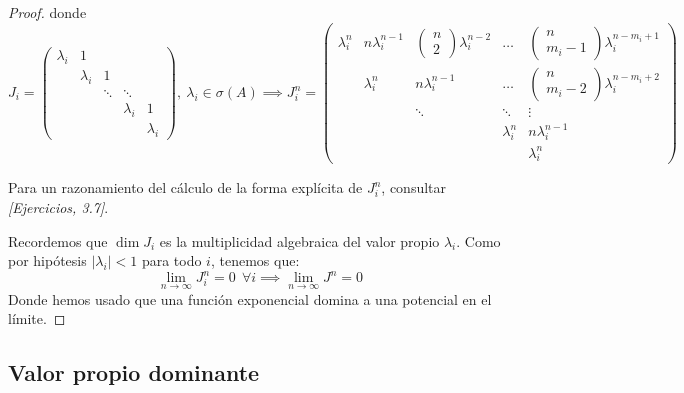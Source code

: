 \begin{proof}
    donde $$J_i = \begin{pmatrix}
        \lambda_i & 1 & & & \\
                  & \lambda_i & 1 & \\
                  & & \ddots & \ddots  \\
                  & & & \lambda_i & 1\\
        & & & & \lambda_i
    \end{pmatrix}, \ \lambda_i \in \sigma(A) \implies J_i^n = \begin{pmatrix}
                \lambda_i^n & n\lambda_i^{n-1} & \begin{pmatrix}
                n\\
                2
\end{pmatrix} \lambda_i^{n-2} & \hdots & \begin{pmatrix}
                    n \\
                    m_i-1
                \end{pmatrix} \lambda_i^{n-m_i +1} \\
                 & \lambda_i^n & n\lambda_i^{n-1} & \hdots & \begin{pmatrix}
	        n\\
	        m_i-2
\end{pmatrix} \lambda_i^{n-m_i+2}\\
                                             &  & \ddots & \ddots & \vdots \\
                                            & & & \lambda_i^n & n\lambda_i^{n-1}\\
                                            & & & & \lambda_i^n
            \end{pmatrix}$$

    Para un razonamiento del cálculo de la forma explícita de $J_i^n$, consultar \textit{[Ejercicios, 3.7]}.

    Recordemos que $\dim J_i$ es la multiplicidad algebraica del valor propio $\lambda_i$. Como por hipótesis $|\lambda_i| < 1$ para todo $i$, tenemos que: $$\lim_{n \to \infty} J_i^n = 0 \ \  \forall i \implies \lim_{n\to\infty} J^n = 0$$ Donde hemos usado que una función exponencial domina a una potencial en el límite.
\end{proof}

\subsection{Valor propio dominante}

